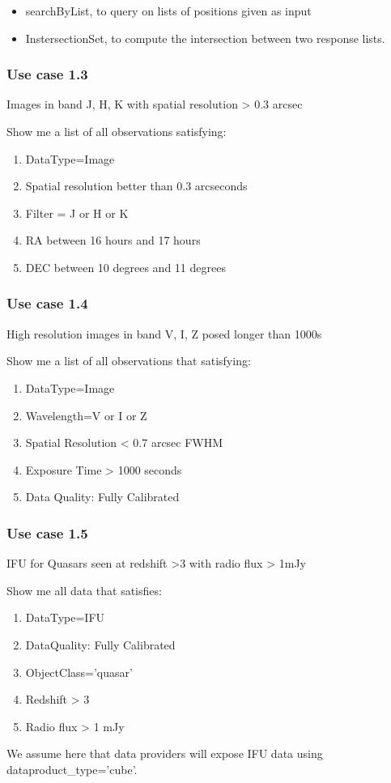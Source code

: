 \documentclass[11pt,a4paper]{ivoa}
\begin{document}
\begin{itemize}
\item searchByList, to query on lists of positions given as input 
\item InstersectionSet, to compute the intersection between two response lists.
\end{itemize}
\subsubsection{Use case 1.3}
Images in band J, H, K with spatial resolution {\textgreater} 0.3 arcsec

Show me a list of all observations satisfying:

\begin{enumerate}
\item DataType=Image
\item Spatial resolution better than 0.3 arcseconds
\item Filter = J or H or K
\item RA between 16 hours and 17 hours
\item DEC between 10 degrees and 11 degrees
\end{enumerate}
\subsubsection[Use case 1.4 ]{Use case 1.4}
High resolution images in band V, I, Z posed longer than 1000s

Show me a list of all observations that satisfying:

\begin{enumerate}
\item DataType=Image
\item Wavelength=V or I or Z
\item Spatial Resolution {\textless} 0.7 arcsec FWHM
\item Exposure Time {\textgreater} 1000 seconds
\item Data Quality: Fully Calibrated
\end{enumerate}
\subsubsection[Use case 1.5]{Use case 1.5}
IFU for Quasars seen at redshift {\textgreater}3 with radio flux {\textgreater} 1mJy

Show me all data that satisfies:

\begin{enumerate}
\item DataType=IFU
\item DataQuality: Fully Calibrated
\item ObjectClass='quasar' 
\item Redshift {\textgreater} 3
\item Radio flux {\textgreater} 1 mJy
\end{enumerate}
We assume here that data providers will expose IFU data using dataproduct\_type='cube'.
\end{document}
